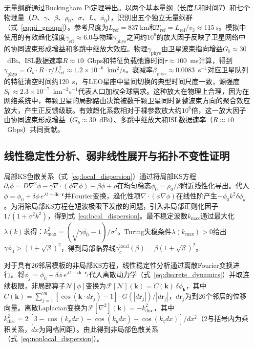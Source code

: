 \documentclass[sn-nature,pdflatex]{sn-jnl}
\begin{document}
无量纲群通过Buckingham Pi定理导出。以两个基本量纲（长度$L$和时间$T$）和七个物理量（$D$、$\gamma$、$\beta$、$\rho_0$、$\sigma$、$L$、$\phi_0$），识别出五个独立无量纲群（式~\ref{eq:pi_groups}）。参考尺度为$L_{\text{ref}} = \SI{837}{\km}$和$T_{\text{ref}} = L_{\text{ref}}/v_3 \approx \SI{115}{\second}$。模拟中使用的有效趋化强度$\gamma_{\text{eff}} \approx 6.0$与物理$\gamma_{\text{phys}}$之间约$10^6$的放大因子反映了卫星网络中的协同波束形成增益和多跳中继放大效应。物理$\gamma_{\text{phys}}$由卫星波束指向增益$G_b \approx 30$~dBi、ISL数据速率$R \approx 10$~Gbps和特征负载弛豫时间$\tau \approx 100$~ms计算，得到$\gamma_{\text{phys}} = G_b \cdot R \cdot \tau / L_{\text{ref}}^2 \approx 1.2 \times 10^{-6}$~km$^2$/s。衰减率$\beta_{\text{phys}} \approx 0.0083$~s$^{-1}$对应卫星队列的特征清空时间约120~s，与LEO星座中星间切换的典型时间尺度一致，源强度$S_0 \approx 2.3 \times 10^{-7}$~km$^{-2}$s$^{-1}$代表人口加权全球需求。这种放大在物理上合理，因为在网络系统中，每颗卫星的局部路由决策被数千颗卫星同时调整波束方向的聚合效应放大，产生正反馈级联。有效趋化系数相对于裸参数放大约$10^6$倍，这一放大因子由协同波束形成增益（$G_b \approx 30$~dBi）、多跳中继放大和ISL数据速率（$R \approx 10$~Gbps）共同贡献。

\subsection{线性稳定性分析、弱非线性展开与拓扑不变性证明}

局部KS色散关系（式~\ref{eq:local_dispersion}）通过将局部KS方程$\partial_t\phi = D\nabla^2\phi - \gamma\nabla\cdot(\phi\nabla\phi) - \beta\phi + \rho$在均匀稳态$\phi_0 = \rho_0/\beta$附近线性化导出。代入$\phi = \phi_0 + \delta\phi\, e^{\lambda t + i\mathbf{k}\cdot\mathbf{r}}$并Fourier变换，趋化性项$\nabla\cdot(\phi\nabla\phi)$在线性阶产生$-\phi_0 k^2\delta\phi_k$。为消除局部KS方程在短波极限下发散的问题，引入非局部正则化因子$1/(1+\sigma^2 k^2)$，得到式~\ref{eq:local_dispersion}。最不稳定波数$k_{\max}$通过最大化$\lambda(k)$求得：$k_{\max}^2 = (\sqrt{\gamma\phi_0} - 1)/\sigma^2$。Turing失稳条件$\lambda(k_{\max}) > 0$给出$\gamma\phi_0 > (1+\sqrt{\beta})^2$，得到局部临界线$\gamma_c^{\text{local}}(\beta) = \beta(1+\sqrt{\beta})^2$。

对于具有26邻居模板的非局部KS方程，线性稳定性分析通过离散Fourier变换进行。将$\phi_j = \phi_0 + \delta\phi\, e^{\lambda t + i\mathbf{k}\cdot\mathbf{r}_j}$代入离散动力学（式~\ref{eq:discrete_dynamics}）并取连续极限，非局部算子$\mathcal{N}[\phi]$变换为$\mathcal{F}[\mathcal{N}](\mathbf{k}) = C(\mathbf{k})\,\delta\phi_{\mathbf{k}}$，其中$C(\mathbf{k}) = \sum_{j=1}^{26} [\cos(\mathbf{k}\cdot d\mathbf{r}_j) - 1] \cdot G(|d\mathbf{r}_j|)/|d\mathbf{r}_j|$，$d\mathbf{r}_j$为到26个邻居的位移向量。离散Laplacian变换为$\mathcal{F}[\nabla^2](\mathbf{k}) = -k^2_{\text{disc}}$，其中$k^2_{\text{disc}} = 2\,[3 - \cos(k_x dx) - \cos(k_y dx) - \cos(k_z dx)]/dx^2$（$2$与括号内为乘积关系，$dx$为网格间距）。由此得到非局部色散关系（式~\ref{eq:nonlocal_dispersion}）。
\end{document}

